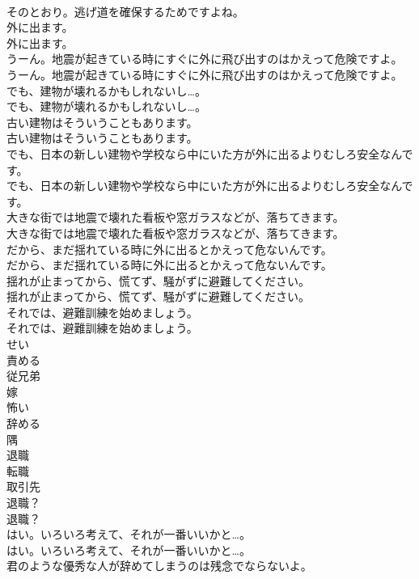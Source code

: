 \documentclass[8pt]{extreport}
\begin{document}
\begin{CJK}{UTF8}{min}
\\	そのとおり。逃げ道を確保するためですよね。 
\\	外に出ます。	
\\	外に出ます。 
\\	うーん。地震が起きている時にすぐに外に飛び出すのはかえって危険ですよ。	
\\	うーん。地震が起きている時にすぐに外に飛び出すのはかえって危険ですよ。 
\\	でも、建物が壊れるかもしれないし…。	
\\	でも、建物が壊れるかもしれないし…。 
\\	古い建物はそういうこともあります。	
\\	古い建物はそういうこともあります。 
\\	でも、日本の新しい建物や学校なら中にいた方が外に出るよりむしろ安全なんです。	
\\	でも、日本の新しい建物や学校なら中にいた方が外に出るよりむしろ安全なんです。 
\\	大きな街では地震で壊れた看板や窓ガラスなどが、落ちてきます。	
\\	大きな街では地震で壊れた看板や窓ガラスなどが、落ちてきます。 
\\	だから、まだ揺れている時に外に出るとかえって危ないんです。	
\\	だから、まだ揺れている時に外に出るとかえって危ないんです。 
\\	揺れが止まってから、慌てず、騒がずに避難してください。	
\\	揺れが止まってから、慌てず、騒がずに避難してください。 
\\	それでは、避難訓練を始めましょう。	
\\	それでは、避難訓練を始めましょう。 
\\	せい
\\	責める
\\	従兄弟
\\	嫁
\\	怖い
\\	辞める
\\	隅
\\	退職
\\	転職
\\	取引先
\\	退職？	
\\	退職？ 
\\	はい。いろいろ考えて、それが一番いいかと…。	
\\	はい。いろいろ考えて、それが一番いいかと…。 
\\	君のような優秀な人が辞めてしまうのは残念でならないよ。	

\end{CJK}
\end{document}
